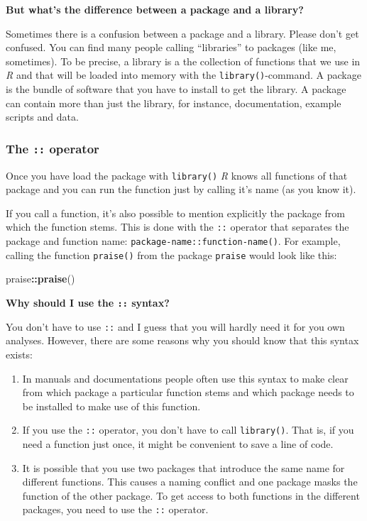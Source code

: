 \documentclass[
]{scrartcl}
\newenvironment{Shaded}{\begin{snugshade}}{\end{snugshade}}
\newcommand{\FunctionTok}[1]{\textcolor[rgb]{0.13,0.29,0.53}{\textbf{#1}}}
\newcommand{\NormalTok}[1]{#1}
\newcommand{\SpecialCharTok}[1]{\textcolor[rgb]{0.81,0.36,0.00}{\textbf{#1}}}
\providecommand{\tightlist}{%
  \setlength{\itemsep}{0pt}\setlength{\parskip}{0pt}}
\begin{document}
\textbf{But what's the difference between a package and a library?}

Sometimes there is a confusion between a package and a library. Please don't get confused. You can find many people calling ``libraries'' to packages (like me, sometimes). To be precise, a library is a the collection of functions that we use in \emph{R} and that will be loaded into memory with the \texttt{library()}-command. A package is the bundle of software that you have to install to get the library. A package can contain more than just the library, for instance, documentation, example scripts and data.

\subsubsection*{\texorpdfstring{The \texttt{::} operator}{The :: operator}}\label{the-operator}

Once you have load the package with \texttt{library()} \emph{R} knows all functions of that package and you can run the function just by calling it's name (as you know it).

If you call a function, it's also possible to mention explicitly the package from which the function stems. This is done with the \texttt{::} operator that separates the package and function name: \texttt{package-name::function-name()}. For example, calling the function \texttt{praise()} from the package \texttt{praise} would look like this:

\begin{Shaded}
\begin{Highlighting}[]
\NormalTok{praise}\SpecialCharTok{::}\FunctionTok{praise}\NormalTok{()}
\end{Highlighting}
\end{Shaded}

\textbf{Why should I use the \texttt{::} syntax?}

You don't have to use \texttt{::} and I guess that you will hardly need it for you own analyses. However, there are some reasons why you should know that this syntax exists:

\begin{enumerate}
\def\labelenumi{\arabic{enumi}.}
\tightlist
\item
  In manuals and documentations people often use this syntax to make clear from which package a particular function stems and which package needs to be installed to make use of this function.
\item
  If you use the \texttt{::} operator, you don't have to call \texttt{library()}. That is, if you need a function just once, it might be convenient to save a line of code.
\item
  It is possible that you use two packages that introduce the same name for different functions. This causes a naming conflict and one package masks the function of the other package. To get access to both functions in the different packages, you need to use the \texttt{::} operator.
\end{enumerate}
\end{document}

